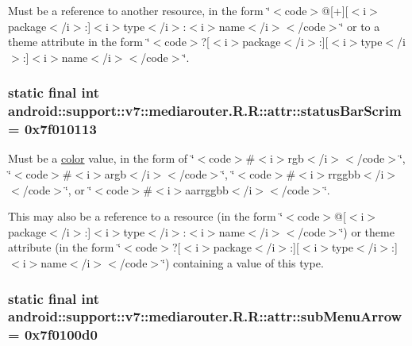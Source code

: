 Must be a reference to another resource, in the form \char`\"{}$<$code$>$@\mbox{[}+\mbox{]}\mbox{[}$<$i$>$package$<$/i$>$:\mbox{]}$<$i$>$type$<$/i$>$:$<$i$>$name$<$/i$>$$<$/code$>$\char`\"{} or to a theme attribute in the form \char`\"{}$<$code$>$?\mbox{[}$<$i$>$package$<$/i$>$:\mbox{]}\mbox{[}$<$i$>$type$<$/i$>$:\mbox{]}$<$i$>$name$<$/i$>$$<$/code$>$\char`\"{}. \hypertarget{classandroid_1_1support_1_1v7_1_1mediarouter_1_1_r_1_1attr_f914dd90c41faef0f8f7e7cea9cbc0e6}{
\subsubsection[{statusBarScrim}]{\setlength{\rightskip}{0pt plus 5cm}static final int android::support::v7::mediarouter.R.R::attr::statusBarScrim = 0x7f010113}}
\label{classandroid_1_1support_1_1v7_1_1mediarouter_1_1_r_1_1attr_f914dd90c41faef0f8f7e7cea9cbc0e6}


Must be a \hyperlink{classandroid_1_1support_1_1v7_1_1mediarouter_1_1_r_1_1color}{color} value, in the form of \char`\"{}$<$code$>$\#$<$i$>$rgb$<$/i$>$$<$/code$>$\char`\"{}, \char`\"{}$<$code$>$\#$<$i$>$argb$<$/i$>$$<$/code$>$\char`\"{}, \char`\"{}$<$code$>$\#$<$i$>$rrggbb$<$/i$>$$<$/code$>$\char`\"{}, or \char`\"{}$<$code$>$\#$<$i$>$aarrggbb$<$/i$>$$<$/code$>$\char`\"{}. 

This may also be a reference to a resource (in the form \char`\"{}$<$code$>$@\mbox{[}$<$i$>$package$<$/i$>$:\mbox{]}$<$i$>$type$<$/i$>$:$<$i$>$name$<$/i$>$$<$/code$>$\char`\"{}) or theme attribute (in the form \char`\"{}$<$code$>$?\mbox{[}$<$i$>$package$<$/i$>$:\mbox{]}\mbox{[}$<$i$>$type$<$/i$>$:\mbox{]}$<$i$>$name$<$/i$>$$<$/code$>$\char`\"{}) containing a value of this type. \hypertarget{classandroid_1_1support_1_1v7_1_1mediarouter_1_1_r_1_1attr_1b845285c64b0025e836f76633879044}{
\subsubsection[{subMenuArrow}]{\setlength{\rightskip}{0pt plus 5cm}static final int android::support::v7::mediarouter.R.R::attr::subMenuArrow = 0x7f0100d0}}
\label{classandroid_1_1support_1_1v7_1_1mediarouter_1_1_r_1_1attr_1b845285c64b0025e836f76633879044}


